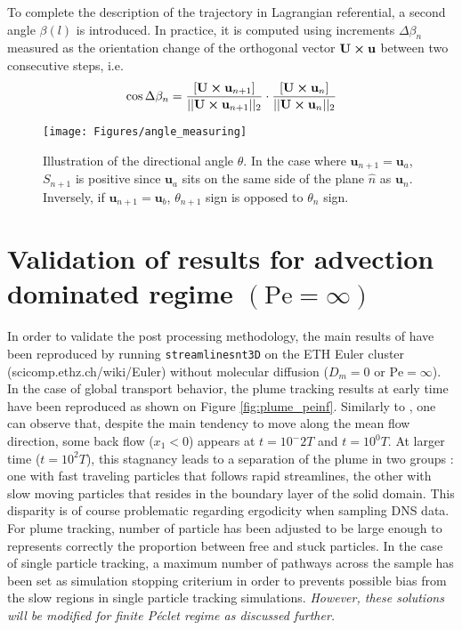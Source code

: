 To complete the description of the trajectory in Lagrangian referential, a second angle $\beta(l)$ is introduced. In practice, it is computed using increments $\Delta \beta_n$ measured as the orientation change of the orthogonal vector $\textbf{U}\cross \textbf{u}$ between two consecutive steps, i.e.
\begin{equation}
\cos\Delta\beta_n = \frac{[\textbf{U}\cross \textbf{u}_{n+1}]}{||\textbf{U}\cross \textbf{u}_{n+1}||_2}
\cdot
\frac{[\textbf{U}\cross \textbf{u}_{n}]}{||\textbf{U}\cross \textbf{u}_n||_2}
\end{equation}

\begin{figure}
	\centering
	\texttt{[image: Figures/angle\_measuring]}
	\caption{Illustration of the directional angle $\theta$. In the case where $\textbf{u}_{n+1} = \textbf{u}_a$, $S_{n+1}$ is positive since $\textbf{u}_a$ sits on the same side of the plane $\hat{n}$ as $\textbf{u}_n$. Inversely, if $\textbf{u}_{n+1} = \textbf{u}_b$, $\theta_{n+1}$ sign is opposed to $\theta_n$ sign. }
	\label{fig:anglemeasuring}
\end{figure}


\section{Validation of \cite{Meyer2016} results for advection dominated regime $(\mathrm{Pe}=\infty)$}
In order to validate the post processing methodology, the main results of \cite{Meyer2016} have been reproduced by running \texttt{streamlinesnt3D} on the ETH Euler cluster (scicomp.ethz.ch/wiki/Euler) without molecular diffusion ($D_m=0$ or $\mathrm{Pe}=\infty$).\\ 

In the case of global transport behavior, the plume tracking results at early time have been reproduced as shown on Figure \ref{fig:plume_peinf}. 
Similarly to \cite{Meyer2016}, one can observe that, despite the main tendency to move along the mean flow direction, some back flow ($x_1<0$) appears at $t=10^-2T$ and $t=10^0T$. 
At larger time ($t=10^2T$), this stagnancy leads to a separation of the plume in two groups : one with fast traveling particles that follows rapid streamlines, the other with slow moving particles that resides in the boundary layer of the solid domain.
This disparity is of course problematic regarding ergodicity when sampling DNS data.
For plume tracking, number of particle has been adjusted to be large enough to represents correctly the proportion between free and stuck particles.
In the case of single particle tracking, a maximum number of pathways across the sample has been set as simulation stopping criterium in order to prevents possible bias from the slow regions in single particle tracking simulations.
\textit{However, these solutions will be modified for finite Péclet regime as discussed further. }

